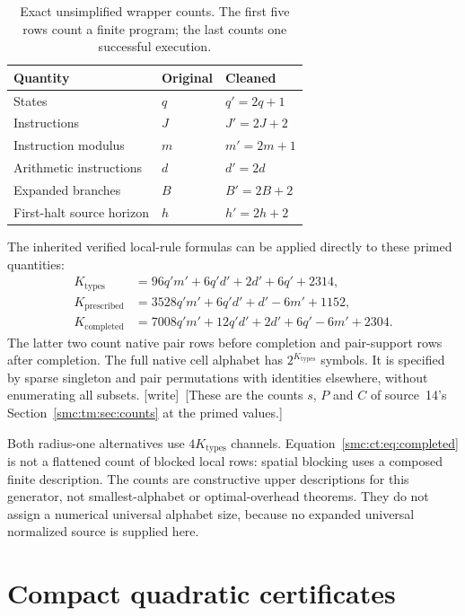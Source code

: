 \documentclass[11pt,letterpaper]{article}
\numberwithin{equation}{section}
\theoremstyle{definition}
\theoremstyle{remark}
\newcommand{\wtag}{\textup{[write]}}
\begin{document}
\begin{table}[htbp]
\centering
\begin{tabular}{@{}lll@{}}
\toprule
Quantity & Original & Cleaned\\
\midrule
States & $q$ & $q'=2q+1$\\
Instructions & $J$ & $J'=2J+2$\\
Instruction modulus & $m$ & $m'=2m+1$\\
Arithmetic instructions & $d$ & $d'=2d$\\
Expanded branches & $B$ & $B'=2B+2$\\
First-halt source horizon & $h$ & $h'=2h+2$\\
\bottomrule
\end{tabular}
\caption{Exact unsimplified wrapper counts. The first five rows count a finite program; the last counts one successful execution.}
\end{table}

The inherited verified local-rule formulas can be applied directly to these primed quantities:
\begin{align}
K_{\mathrm{types}}&=96q'm'+6q'd'+2d'+6q'+2314,\label{smc:ct:eq:types}\\
K_{\mathrm{prescribed}}&=3528q'm'+6q'd'+d'-6m'+1152,\label{smc:ct:eq:prescribed}\\
K_{\mathrm{completed}}&=7008q'm'+12q'd'+2d'+6q'-6m'+2304.\label{smc:ct:eq:completed}
\end{align}
The latter two count native pair rows before completion and pair-support rows after completion. The full native cell alphabet has $2^{K_{\mathrm{types}}}$ symbols. It is specified by sparse singleton and pair permutations with identities elsewhere, without enumerating all subsets. \wtag\ [These are the counts $s$, $P$ and $C$ of source~14's Section~\ref{smc:tm:sec:counts} at the primed values.]

Both radius-one alternatives use $4K_{\mathrm{types}}$ channels. Equation~\eqref{smc:ct:eq:completed} is not a flattened count of blocked local rows: spatial blocking uses a composed finite description. The counts are constructive upper descriptions for this generator, not smallest-alphabet or optimal-overhead theorems. They do not assign a numerical universal alphabet size, because no expanded universal normalized source is supplied here.

\section{Compact quadratic certificates}\label{smc:ct:sec:certificate}
\end{document}
